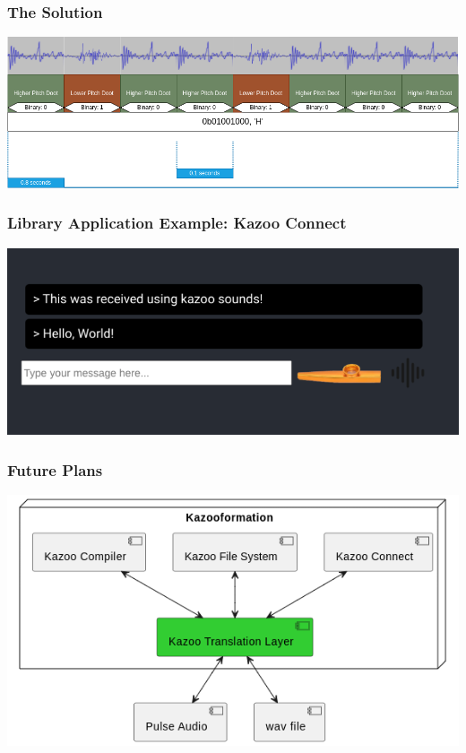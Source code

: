 \documentclass[
	11pt, %
]{beamer}
\begin{document}

\begin{frame}
  \frametitle{The Solution}

  \begin{center}
    \includegraphics[width=1\linewidth]{kazoo_signals.png}
  \end{center}

\end{frame}

\begin{frame}
  \frametitle{Library Application Example: Kazoo Connect}

  \begin{center}
    \includegraphics[width=1\linewidth]{kazoo_connect.png}
  \end{center}

\end{frame}

\begin{frame}
  \frametitle{Future Plans}

  \begin{center}
    \includegraphics[width=1\linewidth]{org_diagram.png}
  \end{center}

\end{frame}
\end{document}

